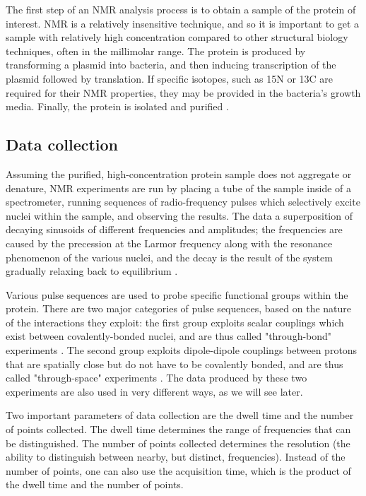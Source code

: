 The first step of an NMR analysis process is to obtain a sample of the protein
of interest.  NMR is a relatively insensitive technique, and so it is important
to get a sample with relatively high concentration compared to other structural
biology techniques, often in the millimolar range.  The protein is produced
by transforming a plasmid into bacteria, and then inducing transcription 
of the plasmid followed by translation.  If specific isotopes, such as 15N or 
13C are required for their NMR properties, they may be provided in the 
bacteria's growth media.  Finally, the protein is isolated and purified
\cite{derome1987modern}.

\subsection*{Data collection}

Assuming the purified, high-concentration protein sample does not aggregate
or denature, NMR experiments are run by placing a tube of the sample inside 
of a spectrometer, running sequences of radio-frequency pulses which selectively
excite nuclei within the sample, and observing the results.  The data a 
superposition of decaying sinusoids of different frequencies and amplitudes;
the frequencies are caused by the precession at the Larmor frequency along with
the resonance phenomenon of the various nuclei, and the decay is the result
of the system gradually relaxing back to equilibrium \cite{bloch1946nuclear}.

Various pulse sequences are used to probe specific functional groups within
the protein.  There are two major categories of pulse sequences, based on the
nature of the interactions they exploit: the first group exploits scalar 
couplings which exist between covalently-bonded nuclei, and are thus called 
"through-bond" experiments \cite{davis1985assignment}.  
The second group exploits dipole-dipole couplings
between protons that are spatially close but do not have to be covalently
bonded, and are thus called "through-space" experiments
\cite{solomon1955relaxation}.  The data produced by
these two experiments are also used in very different ways, as we will see
later.

Two important parameters of data collection are the dwell time and the number
of points collected.  The dwell time determines the range of frequencies that
can be distinguished.  The number of points collected determines the resolution
(the ability to distinguish between nearby, but distinct, frequencies).  Instead
of the number of points, one can also use the acquisition time, which is the
product of the dwell time and the number of points.

